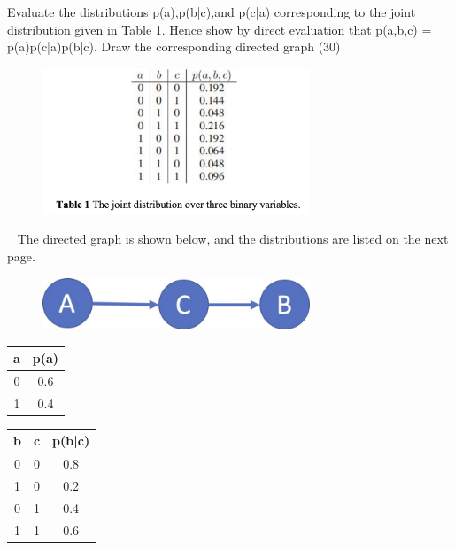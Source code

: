 \begin{exercise}{Evaluate the distributions p(a),p(b|c),and p(c|a) corresponding to the joint distribution given in Table 1. Hence show by direct evaluation that p(a,b,c) = p(a)p(c|a)p(b|c). Draw the corresponding directed graph (30)
    \begin{figure}[ht]
        \centering
        \includegraphics[width=8cm]{img/ex3-1.jpg}
    \end{figure}
    }
  \begin{solution}
  \par{~}
  The directed graph is shown below, and the distributions are listed on the next page.

  \begin{figure}[ht]
        \centering
        \includegraphics[width=8cm]{img/ex3-5.jpg}
    \end{figure}


  \begin{table}[p]
    \centering
    \begin{tabular}{cc}
    \hline
    a & p(a) \\ \hline
    0 & 0.6  \\
    1 & 0.4  \\ \hline
    \end{tabular}


\begin{tabular}{ccc}
    \hline
    b & c & p(b|c) \\ \hline
    0 & 0 & 0.8    \\
    1 & 0 & 0.2    \\
    0 & 1 & 0.4    \\
    1 & 1 & 0.6    \\ \hline
    \end{tabular}


\end{table}
\end{solution}
\end{exercise}
